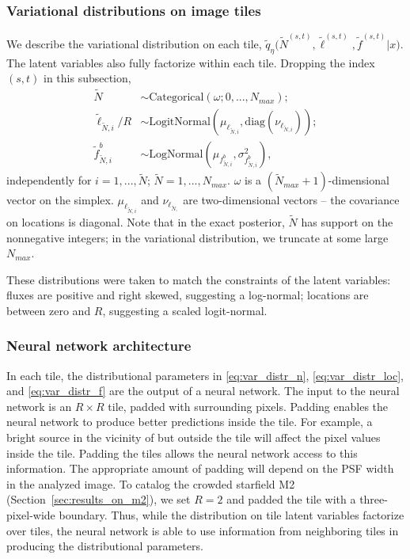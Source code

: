 \subsubsection{Variational distributions on image tiles}
\label{sec:distr_on_tiles}
We describe the variational distribution on each tile,
$\tilde q_\eta\big(\tilde N^{(s, t)}, \tilde \ell^{(s, t)}, \tilde f^{(s, t)} | x\big)$.
The latent variables also fully factorize within each tile. 
Dropping the index 
$(s,t)$ in this subsection, 
\begin{align}
    \tilde N &\sim \text{Categorical}(
    \omega; 0, ..., N_{max});  \label{eq:var_distr_n}\\
	\tilde \ell_{\tilde N, i} / R &\sim \text{LogitNormal}(\mu_{\ell_{\tilde N, i}}, \text{diag}(\nu_{\ell_{\tilde N, i}}) )\label{eq:var_distr_loc}; \\
	\tilde f^b_{\tilde N, i} &\sim \text{LogNormal}(\mu_{f^b_{\tilde N, i}}, \sigma^2_{f^b_{\tilde N, i}}), \label{eq:var_distr_f}
\end{align}
independently for $i = 1, ..., \tilde N$; $\tilde{N} = 1, ..., N_{max}$. 
$\omega$ is a $(\tilde N_{max} + 1)$-dimensional vector on the simplex. $\mu_{\ell_{\tilde N, i}}$ and $\nu_{\ell_{\tilde N, }}$ are two-dimensional vectors -- the covariance on locations is diagonal. 
Note that in the exact posterior, $\tilde N$ has support on the nonnegative integers; in the variational distribution, we truncate at some large $N_{max}$. 


These distributions were taken to match the constraints of the latent variables: fluxes are positive and right skewed, suggesting a log-normal; locations are between zero and $R$, suggesting a scaled logit-normal. 

\subsubsection{Neural network architecture}
\label{sec:nn_archetecture}

In each tile, the distributional parameters in \eqref{eq:var_distr_n},
\eqref{eq:var_distr_loc}, and \eqref{eq:var_distr_f} are the output of a neural network. 
The input to the neural network is an $R \times R$ tile, padded with surrounding pixels.
Padding enables the neural network to produce better predictions inside the tile. 
For example, a bright source in the vicinity of but outside the tile will affect the pixel values inside the tile. 
Padding the tiles allows the neural network access to this information. 
The appropriate amount of padding will depend on the PSF width in the analyzed image. 
To catalog the crowded starfield M2 (Section~\ref{sec:results_on_m2}),
we set $R = 2$ and padded the tile with a three-pixel-wide boundary.
Thus, while the distribution on tile latent variables factorize over tiles, the neural network is able to use information from neighboring tiles in producing the distributional parameters. 


